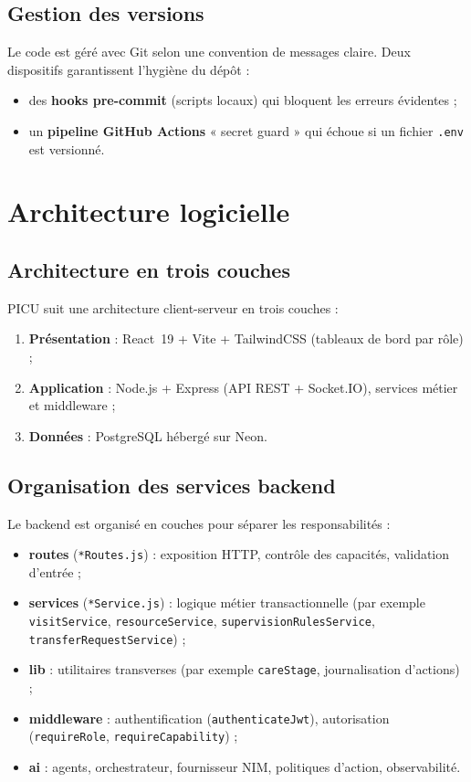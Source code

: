 \subsection{Gestion des versions}

Le code est géré avec Git selon une convention de messages claire. Deux dispositifs garantissent l'hygiène du dépôt :

\begin{itemize}
    \item des \textbf{hooks pre-commit} (scripts locaux) qui bloquent les erreurs évidentes ;
    \item un \textbf{pipeline GitHub Actions} « secret guard » qui échoue si un fichier \texttt{.env} est versionné.
\end{itemize}

\section{Architecture logicielle}

\subsection{Architecture en trois couches}

PICU suit une architecture client-serveur en trois couches :

\begin{enumerate}
    \item \textbf{Présentation} : React~19 + Vite + TailwindCSS (tableaux de bord par rôle) ;
    \item \textbf{Application} : Node.js + Express (API REST + Socket.IO), services métier et middleware ;
    \item \textbf{Données} : PostgreSQL hébergé sur Neon.
\end{enumerate}

\subsection{Organisation des services backend}

Le backend est organisé en couches pour séparer les responsabilités :

\begin{itemize}
    \item \textbf{routes} (\texttt{*Routes.js}) : exposition HTTP, contrôle des capacités, validation d'entrée ;
    \item \textbf{services} (\texttt{*Service.js}) : logique métier transactionnelle (par exemple \texttt{visitService}, \texttt{resourceService}, \texttt{supervisionRulesService}, \texttt{transferRequestService}) ;
    \item \textbf{lib} : utilitaires transverses (par exemple \texttt{careStage}, journalisation d'actions) ;
    \item \textbf{middleware} : authentification (\texttt{authenticateJwt}), autorisation (\texttt{requireRole}, \texttt{requireCapability}) ;
    \item \textbf{ai} : agents, orchestrateur, fournisseur NIM, politiques d'action, observabilité.
\end{itemize}

